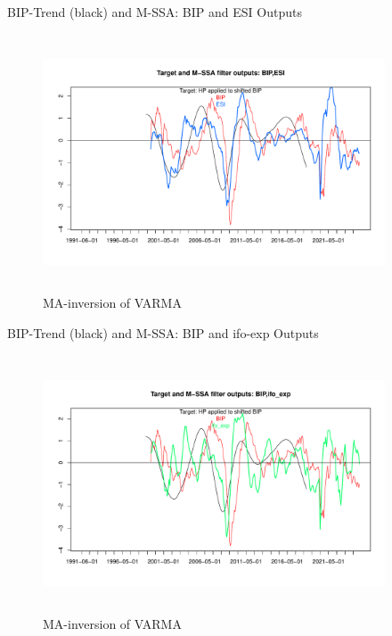 \documentclass{beamer}
\begin{document}
\begin{frame} {BIP-Trend (black) and M-SSA: BIP and ESI Outputs}
\begin{figure}[H]\begin{center}\includegraphics[height=3in, width=4in]{M_SSA_output_2.pdf}\caption{MA-inversion of VARMA\label{cor}}\end{center}\end{figure}\end{frame}


\begin{frame} {BIP-Trend (black) and M-SSA: BIP and ifo-exp Outputs}
\begin{figure}[H]\begin{center}\includegraphics[height=3in, width=4in]{M_SSA_output_3.pdf}\caption{MA-inversion of VARMA\label{cor}}\end{center}\end{figure}\end{frame}
\end{document}
